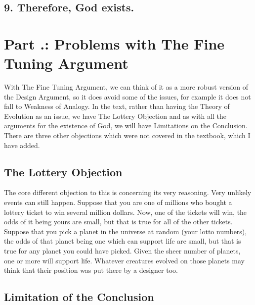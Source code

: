 \subsection{9. Therefore, God exists.}

\section{Part \thechapcount.\theseccount: Problems with The Fine Tuning Argument}
With The Fine Tuning Argument, we can think of it as a more robust version of the Design Argument, so it does avoid some of the issues, for example it does not fall to Weakness of Analogy. In the text, rather than having the Theory of Evolution as an issue, we have The Lottery Objection and as with all the arguments for the existence of God, we will have Limitations on the Conclusion. There are three other objections which were not covered in the textbook, which I have added.
\subsection{The Lottery Objection}

The core different objection to this is concerning its very reasoning. Very unlikely events can still happen. Suppose that you are one of millions who bought a lottery ticket to win several million dollars. Now, one of the tickets will win, the odds of it being yours are small, but that is true for all of the other tickets. Suppose that you pick a planet in the universe at random (your lotto numbers), the odds of that planet being one which can support life are small, but that is true for any planet you could have picked. Given the sheer number of planets, one or more will support life. Whatever creatures evolved on those planets may think that their position was put there by a designer too.
\subsection{Limitation of the Conclusion}

